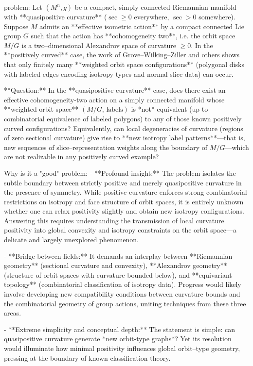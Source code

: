 problem:  
Let \( (M^n, g) \) be a compact, simply connected Riemannian manifold with **quasipositive curvature** (\(\sec \ge 0\) everywhere, \(\sec > 0\) somewhere). Suppose \( M \) admits an **effective isometric action** by a compact connected Lie group \(G\) such that the action has **cohomogeneity two**, i.e. the orbit space \(M/G\) is a two–dimensional Alexandrov space of curvature \(\ge 0\).  In the **positively curved** case, the work of Grove–Wilking–Ziller and others shows that only finitely many **weighted orbit space configurations** (polygonal disks with labeled edges encoding isotropy types and normal slice data) can occur.  

**Question:**  
In the **quasipositive curvature** case, does there exist an effective cohomogeneity-two action on a simply connected manifold whose **weighted orbit space** \( (M/G,\, \text{labels}) \) is *not* equivalent (up to combinatorial equivalence of labeled polygons) to any of those known positively curved configurations?  
Equivalently, can local degeneracies of curvature (regions of zero sectional curvature) give rise to **new isotropy label patterns**—that is, new sequences of slice–representation weights along the boundary of \(M/G\)—which are not realizable in any positively curved example?

Why is it a "good" problem:  
- **Profound insight:**  
  The problem isolates the subtle boundary between strictly positive and merely quasipositive curvature in the presence of symmetry. While positive curvature enforces strong combinatorial restrictions on isotropy and face structure of orbit spaces, it is entirely unknown whether one can relax positivity slightly and obtain new isotropy configurations. Answering this requires understanding the transmission of local curvature positivity into global convexity and isotropy constraints on the orbit space—a delicate and largely unexplored phenomenon.
  
- **Bridge between fields:**  
  It demands an interplay between **Riemannian geometry** (sectional curvature and convexity), **Alexandrov geometry** (structure of orbit spaces with curvature bounded below), and **equivariant topology** (combinatorial classification of isotropy data). Progress would likely involve developing new compatibility conditions between curvature bounds and the combinatorial geometry of group actions, uniting techniques from these three areas.
  
- **Extreme simplicity and conceptual depth:**  
  The statement is simple: can quasipositive curvature generate *new orbit-type graphs*? Yet its resolution would illuminate how minimal positivity influences global orbit–type geometry, pressing at the boundary of known classification theory.
  
